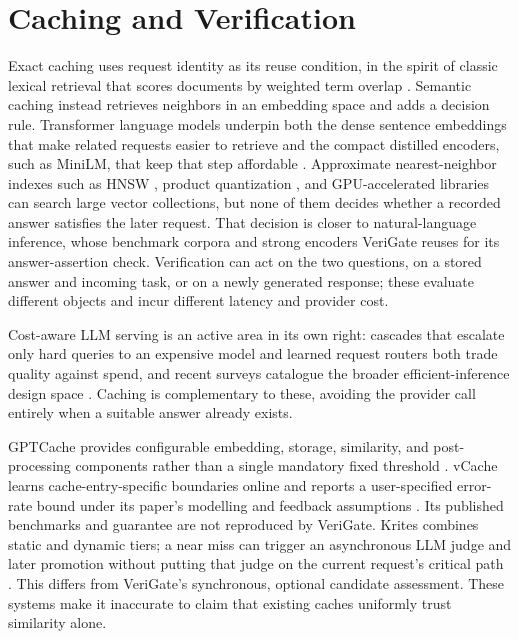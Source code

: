 \section{Caching and Verification}
Exact caching uses request identity as its reuse condition, in the spirit of classic lexical retrieval that scores documents by weighted term overlap \cite{salton1988term}. Semantic caching instead retrieves neighbors in an embedding space and adds a decision rule. Transformer language models \cite{vaswani2017attention,devlin2019bert} underpin both the dense sentence embeddings that make related requests easier to retrieve \cite{reimers2019sentencebert} and the compact distilled encoders, such as MiniLM, that keep that step affordable \cite{wang2020minilm}. Approximate nearest-neighbor indexes such as HNSW \cite{malkov2018hnsw}, product quantization \cite{jegou2011pq}, and GPU-accelerated libraries \cite{johnson2019faiss} can search large vector collections, but none of them decides whether a recorded answer satisfies the later request. That decision is closer to natural-language inference, whose benchmark corpora \cite{bowman2015snli} and strong encoders \cite{he2021deberta} VeriGate reuses for its answer-assertion check. Verification can act on the two questions, on a stored answer and incoming task, or on a newly generated response; these evaluate different objects and incur different latency and provider cost.

Cost-aware LLM serving is an active area in its own right: cascades that escalate only hard queries to an expensive model \cite{chen2023frugalgpt} and learned request routers \cite{ong2024routellm} both trade quality against spend, and recent surveys catalogue the broader efficient-inference design space \cite{zhu2023survey}. Caching is complementary to these, avoiding the provider call entirely when a suitable answer already exists.

GPTCache provides configurable embedding, storage, similarity, and post-processing components rather than a single mandatory fixed threshold \cite{bang2023gptcache,gptcache_docs}. vCache learns cache-entry-specific boundaries online and reports a user-specified error-rate bound under its paper's modelling and feedback assumptions \cite{schroeder2026vcache}. Its published benchmarks and guarantee are not reproduced by VeriGate. Krites combines static and dynamic tiers; a near miss can trigger an asynchronous LLM judge and later promotion without putting that judge on the current request's critical path \cite{krites2026}. This differs from VeriGate's synchronous, optional candidate assessment. These systems make it inaccurate to claim that existing caches uniformly trust similarity alone.


